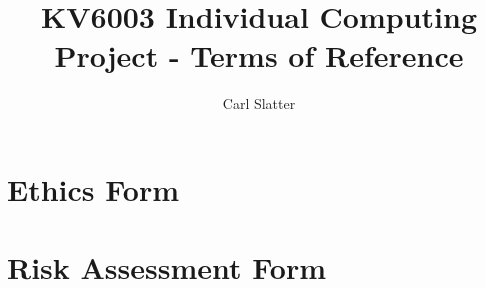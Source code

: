 \documentclass[12pt,a4paper]{article}
\title{ KV6003 Individual Computing Project - Terms of Reference }
\author{Carl Slatter}
\begin{document}
\maketitle




\section{Ethics Form}

 
\section{Risk Assessment Form}

\end{document}
